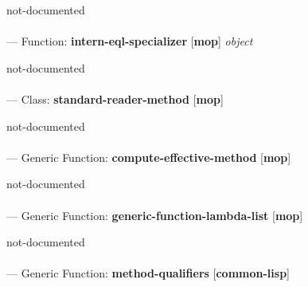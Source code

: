 \begin{adjustwidth}{5em}{5em}
not-documented
\end{adjustwidth}

\paragraph{}
\label{MOP:INTERN-EQL-SPECIALIZER}
--- Function: \textbf{intern-eql-specializer} [\textbf{mop}] \textit{object}

\begin{adjustwidth}{5em}{5em}
not-documented
\end{adjustwidth}

\paragraph{}
\label{MOP:STANDARD-READER-METHOD}
--- Class: \textbf{standard-reader-method} [\textbf{mop}] \textit{}

\begin{adjustwidth}{5em}{5em}
not-documented
\end{adjustwidth}

\paragraph{}
\label{MOP:COMPUTE-EFFECTIVE-METHOD}
--- Generic Function: \textbf{compute-effective-method} [\textbf{mop}] \textit{}

\begin{adjustwidth}{5em}{5em}
not-documented
\end{adjustwidth}

\paragraph{}
\label{MOP:GENERIC-FUNCTION-LAMBDA-LIST}
--- Generic Function: \textbf{generic-function-lambda-list} [\textbf{mop}] \textit{}

\begin{adjustwidth}{5em}{5em}
not-documented
\end{adjustwidth}

\paragraph{}
\label{COMMON-LISP:METHOD-QUALIFIERS}
--- Generic Function: \textbf{method-qualifiers} [\textbf{common-lisp}] \textit{}

